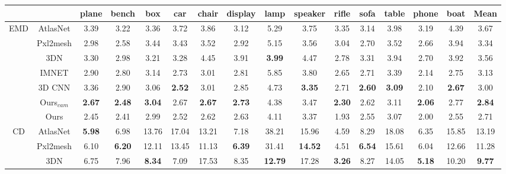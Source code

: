 \begin{table}[htb!]
\hspace*{-0.9cm}
\setlength{\tabcolsep}{1.5pt} \setlength{\arrayrulewidth}{1pt}
\begin{tabular}{c|c|ccccccccccccc|c}
                \Xhline{2\arrayrulewidth}
                     &            & plane & bench & box   & car   & chair & display & lamp  & speaker & rifle & sofa  & table & phone & boat  & Mean  \\ 
                     \hline
\multirow{7}{*}{EMD} & AtlasNet   & 3.39  & 3.22  & 3.36  & 3.72  & 3.86  & 3.12    & 5.29  & 3.75    & 3.35  & 3.14  & 3.98  & 3.19  & 4.39  & 3.67  \\
                     & Pxl2mesh & 2.98  & 2.58  & 3.44  & 3.43  & 3.52  & 2.92    & 5.15  & 3.56    & 3.04  & 2.70  & 3.52  & 2.66  & 3.94  & 3.34  \\
                     & 3DN        & 3.30  & 2.98  & 3.21  & 3.28  & 4.45  & 3.91    & \textbf{3.99}  & 4.47    & 2.78  & 3.31  & 3.94  & 2.70  & 3.92  & 3.56  \\
                     & IMNET     & 2.90  &    2.80  &    3.14  &    2.73  &    3.01  &    2.81    & 5.85  & 3.80    &    2.65  &    2.71  &    3.39  &    2.14    &  2.75  & 3.13       \\
                     & 3D CNN     & 3.36   & 2.90 & 3.06  & \textbf{2.52}   & 3.01  &  2.85  & 4.73   & \textbf{3.35}   &  2.71  &  \textbf{2.60}  & \textbf{3.09}  & 2.10  &  \textbf{2.67}  & 3.00 \\
                     & Ours$_{cam}$& \textbf{2.67}    & \textbf{2.48} &    \textbf{3.04}    & 2.67 &    \textbf{2.67}    & \textbf{2.73} & 4.38 &    3.47 & \textbf{2.30} & 2.62 & 3.11 & \textbf{2.06} & 2.77 & \textbf{2.84}       \\
                     & Ours& 2.45    & 2.41 &    2.99    & 2.52 &    2.62    & 2.63 & 4.11 &    3.37 & 1.93 & 2.55 & 3.07 & 2.00    & 2.55 & 2.71     \\\hline
\multirow{7}{*}{CD}  & AtlasNet   & \textbf{5.98}  & 6.98  & 13.76 & 17.04 & 13.21 & 7.18    & 38.21 & 15.96   & 4.59  & 8.29  & 18.08 & 6.35  & 15.85 & 13.19 \\
                     & Pxl2mesh & 6.10  & \textbf{6.20}  & 12.11 & 13.45 & 11.13 & \textbf{6.39}    & 31.41 & \textbf{14.52}   & 4.51  & \textbf{6.54}  & 15.61 & 6.04  & 12.66 & 11.28 \\
                     & 3DN        & 6.75  & 7.96  & \textbf{8.34}  & 7.09  & 17.53 & 8.35    & \textbf{12.79} & 17.28   & \textbf{3.26}  & 8.27  & 14.05 & \textbf{5.18}  & 10.20 & \textbf{9.77}  \\

\end{tabular}
\end{table}

